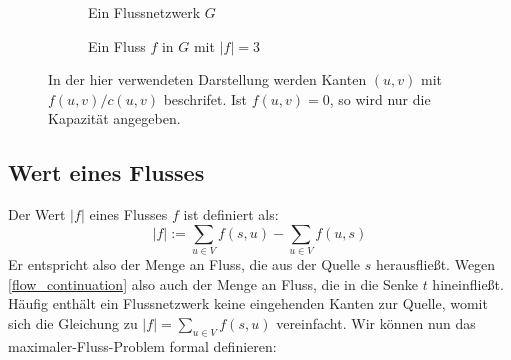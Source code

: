 \documentclass[12pt,a4paper,titlepage,onecolumn,ngerman,bibliography=totocnumbered]{scrartcl}
\theoremstyle{definition}
\theoremstyle{remark}
\begin{document}
\begin{figure}[H]
	\centering
	\begin{subfigure}[t]{.475\textwidth}
		\centering
		\caption{Ein Flussnetzwerk $G$}
		\label{fig:flow_network.1}
	\end{subfigure}
	\hfill
	\begin{subfigure}[t]{.475\textwidth}
		\centering
		\caption{Ein Fluss $f$ in $G$ mit $\lvert f\rvert = 3$}
		\label{fig:flow_network.2}
	\end{subfigure}
	\caption{In der hier verwendeten Darstellung werden Kanten $(u,v)$ mit $f(u,v)/c(u,v)$ beschrifet. Ist $f(u,v) = 0$, so wird nur die Kapazität angegeben.}
	\label{fig:flow_network}
\end{figure}

\subsection{Wert eines Flusses}
Der Wert $\lvert f \rvert$ eines Flusses $f$ ist definiert als:
\begin{equation}\label{flow_value}
	\lvert f \rvert := \sum_{u\in V} f(s,u) - \sum_{u\in V} f(u,s)
\end{equation}
Er entspricht also der Menge an Fluss, die aus der Quelle $s$ herausfließt.
Wegen \eqref{flow_continuation} also auch der Menge an Fluss, die in die Senke $t$ hineinfließt.
Häufig enthält ein Flussnetzwerk keine eingehenden Kanten zur Quelle, womit sich die Gleichung zu $\lvert f \rvert = \sum_{u\in V} f(s,u)$ vereinfacht.
Wir können nun das maximaler-Fluss-Problem formal definieren:
\end{document}
